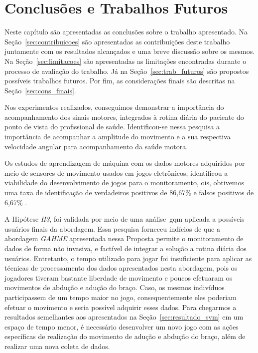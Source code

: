 \chapter{Conclusões e Trabalhos Futuros}\label{chapter:conclusoes_futuros}
Neste capítulo são apresentadas as conclusões sobre o trabalho apresentado. Na Seção~\ref{sec:contribuicoes} são apresentadas as contribuições deste trabalho juntamente com os resultados alcançados e uma breve discussão sobre os mesmos. Na Seção~\ref{sec:limitacoes} são apresentadas as limitações encontradas durante o processo de avaliação do trabalho. Já na Seção~\ref{sec:trab_futuros} são propostos possíveis trabalhos futuros. Por fim, as considerações finais são descritas na Seção~\ref{sec:cons_finais}.



Nos experimentos realizados, conseguimos demonstrar a importância do acompanhamento dos sinais motores, integrados à rotina diária do paciente do ponto de vista do profissional de saúde. Identificou-se nessa pesquisa a importância de acompanhar a amplitude do movimento e a sua respectiva velocidade angular para acompanhamento da saúde motora.

Os estudos de aprendizagem de máquina com os dados motores adquiridos por meio de sensores de movimento usados em jogos eletrônicos, identificou a viabilidade do desenvolvimento de jogos para o monitoramento, ois, obtivemos uma taxa de identificação de verdadeiros positivos de 86,67\% e falsos positivos de 6,67\% .

A Hipótese \textit{H3}, foi validada por meio de uma análise~\ac{gqm} aplicada a possíveis usuários finais da abordagem. Essa pesquisa forneceu indícios de que a abordagem \textit{GAHME} apresentada nessa Proposta permite o monitoramento de dados de forma não invasiva, e factível de integrar a solução a rotina diária dos usuários. Entretanto, o tempo utilizado para jogar foi insuficiente para aplicar as técnicas de processamento dos dados apresentados nesta abordagem, pois os jogadores tiveram bastante liberdade de movimento e poucos efetuaram os movimentos de abdução e adução do braço. Caso, os mesmos indivíduos participassem de um tempo maior no jogo, consequentemente eles poderiam efetuar o movimento e seria possível adquirir esses dados. Para chegarmos a resultados semelhantes aos apresentados na Seção~\ref{sec:resultado_svm} em um espaço de tempo menor, é necessário desenvolver um novo jogo com as ações específicas de realização do movimento de adução e abdução do braço, além de realizar uma nova coleta 
de dados.

